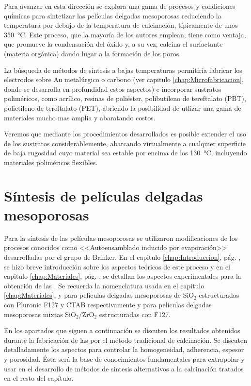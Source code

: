 	Para avanzar en esta dirección se explora una gama de procesos y condiciones químicas para sintetizar las películas delgadas mesoporosas reduciendo la temperatura por debajo de la temperatura de calcinación, típicamente de unos \SI{350}{\celsius}. Este proceso, que la mayoría de los autores emplean, tiene como ventaja, que promueve la condensación del óxido y, a su vez, calcina el surfactante (materia orgánica) dando lugar a la formación de los poros.\cite{Zhang2015,Horiuchi2011,Clark2000,Zhang2005}

	La búsqueda de métodos de síntesis a bajas temperaturas permitiría fabricar los electrodos sobre Au metalúrgico o carbono (ver capitulo \ref{chap:Microfabricacion}, donde se desarrolla en profundidad estos aspectos) e incorporar sustratos poliméricos, como acrílico, resinas de poliéster, polibutileno de tereftalato (PBT), polietileno de tereftalato (PET), abriendo la posibilidad de utlizar una gama de materiales mucho mas amplia y abaratando costos.

	Veremos que mediante los procedimientos desarrollados es posible extender el uso de los sustratos considerablemente, abarcando virtualmente a cualquier superficie de baja rugosidad cuyo material sea estable por encima de los \SI{130}{\celsius}, incluyendo materiales poliméricos flexibles.
		
\section{Síntesis de películas delgadas mesoporosas}
		
		Para la síntesis de las películas mesoporosas se utilizaron modificaciones de los procesos conocidos como <<Autoensamblado inducido por evaporación>> desarrolladas por el grupo de Brinker.\cite{Brinker1999} En el capitulo \ref{chap:Introduccion}, pág. \pageref{sec:mesoporosos}, se hizo breve introducción sobre los aspectos teóricos de este proceso y en el capitulo \ref{chap:Materiales}, pág. \pageref{sec:sintesis_mesoporosos}, se detallan los aspectos experimentales para la obtención de las \pdm. Se recuerda la nomenclatura usada en el capítulo \ref{chap:Materiales}, \pdmF\space y \pdmC\space para películas delgadas mesoporosas de SiO$_2$ estructuradas con Pluronic F127 y CTAB respectivamente y \pdmZ\space para películas delgadas mesoporosas mixtas SiO$_2$/ZrO$_2$ estructuradas con F127.

		En los apartados que siguen a continuación se discuten los resultados obtenidos durante la fabricación de las \pdm\space por el método tradicional de calcinación. Se discuten detalladamente los aspectos para controlar la homogeneidad, adherencia, espesor y porosidad. Ésta será la base de conocimientos fundamentales para extrapolar y usar en el desarrollo de métodos de síntesis alternativos a la calcinación tratados en el resto del capítulo.

